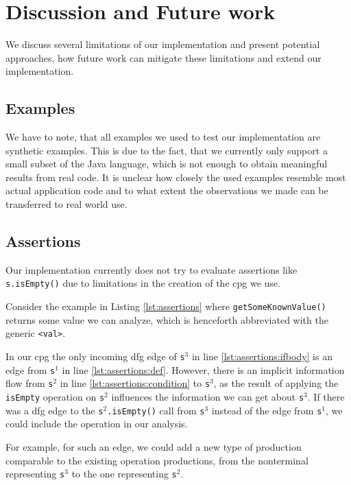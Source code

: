 \section{Discussion and Future work}

We discuss several limitations of our implementation and present potential approaches, how future work can mitigate these limitations and extend our implementation.

\subsection{Examples}

We have to note, that all examples we used to test our implementation are synthetic examples. This is due to the fact, that we currently only support a small subset of the Java language, which is not enough to obtain meaningful results from real code. It is unclear how closely the used examples resemble most actual application code and to what extent the observations we made can be transferred to real world use.

\subsection{Assertions}

Our implementation currently does not try to evaluate assertions like \lstinline|s.isEmpty()| due to limitations in the creation of the \ac{cpg} we use.

Consider the example in Listing \ref{lst:assertions} where \lstinline|getSomeKnownValue()| returns some value we can analyze, which is henceforth abbreviated with the generic \lstinline|<val>|.

In our \ac{cpg} the only incoming \ac{dfg} edge of \lstinline|s|$^3$ in line \ref{lst:assertions:ifbody} is an edge from \lstinline|s|$^1$ in line \ref{lst:assertions:def}. However, there is an implicit information flow from \lstinline|s|$^2$ in line \ref{lst:assertions:condition} to \lstinline|s|$^3$, as the result of applying the \lstinline|isEmpty| operation on \lstinline|s|$^2$ influences the information we can get about \lstinline|s|$^3$. If there was a \ac{dfg} edge to the \lstinline|s|$^2$\lstinline|.isEmpty()| call from \lstinline|s|$^3$ instead of the edge from \lstinline|s|$^1$, we could include the operation in our analysis.

For example, for such an edge, we could add a new type of production comparable to the existing operation productions, from the nonterminal representing \lstinline|s|$^3$ to the one representing \lstinline|s|$^2$.

